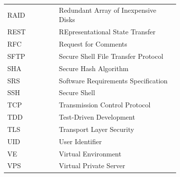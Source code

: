 \begin{longtable}{@{}l p{0.7\linewidth}@{}}
RAID & Redundant Array of Inexpensive Disks \\
REST & REpresentational State Transfer \\
RFC & Request for Comments \\
SFTP & Secure Shell File Transfer Protocol \\
SHA & Secure Hash Algorithm \\
SRS & Software Requirements Specification \\
SSH & Secure Shell \\
TCP & Transmission Control Protocol \\
TDD & Test-Driven Development \\
TLS & Transport Layer Security \\
UID & User Identifier \\
VE & Virtual Environment \\
VPS & Virtual Private Server \\
\end{longtable}
